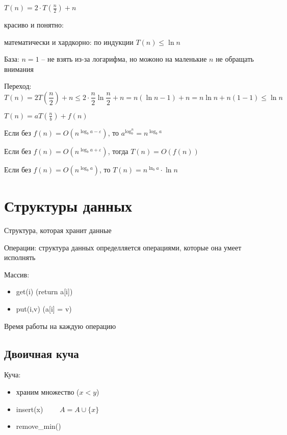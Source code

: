 \documentclass{book}
\theoremstyle{definition}
\begin{document}
    $T(n) = 2 \cdot T(\frac{n}{2}) + n$

    красиво и понятно: 

    математически и хардкорно: по индукции $T(n) \leqslant \ln  n$

    База: $n=1$ -- не взять из-за логарифма, но можоно на маленькие $n$ не обращать внимания

    Переход:  $$T(n) = 2T(\frac{n}{2}) + n \leqslant 2\cdot \frac{n}{2}\ln  \frac{n}{2} + n = n(\ln  n-1)+n = n \ln  n + n(1-1) \leqslant \ln  n$$

    \begin{theorem}

        $T(n) = aT\left( \frac{n}{b} \right) + f(n) $

        Если без $f(n) = O(n^{\log _ba-\varepsilon})$, то $a^{\log _b^n} = n^{\log _ba}$

        Если без $f(n) = O(n^{\log _ba+\varepsilon})$, тогда $T(n) = O(f(n))$

        Если без $f(n) = O(n^{\log _ba})$, то $T(n) = n^{\ln _ba}\cdot \ln  n$
    \end{theorem}
%
%
    \section{Структуры данных}

    Структура, которая хранит данные

    Операции: структура данных определляется операциями, которые она умеет исполнять

    Массив:
    \begin{itemize}
        \item get(i) (return a[i])
        \item put(i,v) (a[i] = v)
    \end{itemize}

    Время работы на каждую операцию

    \subsection{Двоичная куча}

    Куча:
    \begin{itemize}
        \item  храним множество ($x<y$)
        \item insert(x) $\qquad A = A\cup \{x\}$
        \item remove\_min() 
    \end{itemize}
\end{document}
